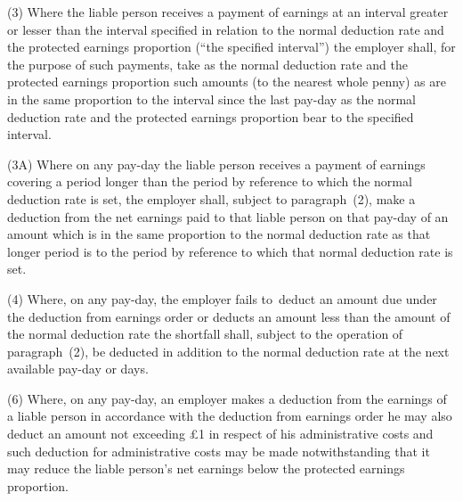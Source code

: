 \documentclass[12pt,a4paper]{article}
\begin{document}
(3) Where the liable person receives a payment of earnings at an interval greater or lesser than the interval specified in relation to the normal deduction rate and the 
protected earnings proportion  %
(“the specified interval”) the employer shall, for the purpose of such payments, take as the normal deduction rate and the  
protected earnings proportion  %
such amounts (to the nearest whole penny) as are in the same proportion to the interval since the last pay-day as the normal deduction rate and the  
protected earnings proportion  %
bear to the specified interval.

(3A) Where on any pay-day the liable person receives a payment of earnings covering a period longer than the period by reference to which the normal deduction rate is set, the employer shall, subject to paragraph~(2), make a deduction from the net earnings paid to that liable person on that pay-day of an amount which is in the same proportion to the normal deduction rate as that longer period is to the period by reference to which that normal deduction rate is set.

(4) Where, on any pay-day, the employer fails to~deduct an amount due under the deduction from earnings order or deducts an amount less than the amount of the normal deduction rate the shortfall shall, subject to the operation of paragraph~(2), be deducted in addition to the normal deduction rate at the next available pay-day or days.


(6) Where, on any pay-day, an employer makes a deduction from the earnings of a liable person in accordance with the deduction from earnings order he may also deduct an amount not exceeding £1 in respect of his administrative costs and such deduction for administrative costs may be made notwithstanding that it may reduce the liable person’s net earnings below the  
protected earnings proportion.  %
\end{document}
